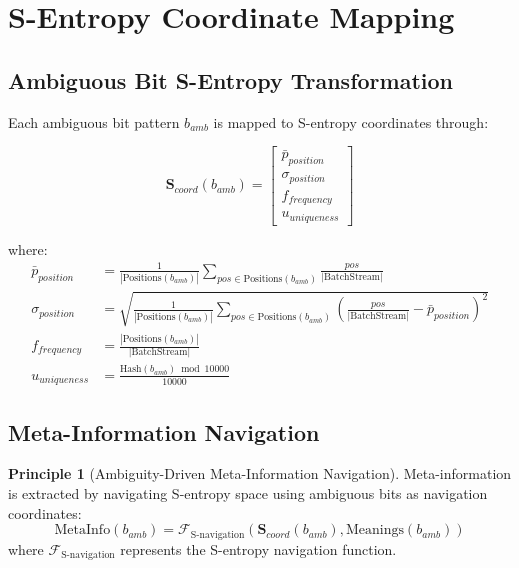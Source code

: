 \documentclass[12pt,a4paper]{article}
\theoremstyle{definition}
\newtheorem{principle}{Principle}
\begin{document}
\section{S-Entropy Coordinate Mapping}

\subsection{Ambiguous Bit S-Entropy Transformation}

Each ambiguous bit pattern $b_{amb}$ is mapped to S-entropy coordinates through:

\begin{equation}
\mathbf{S}_{coord}(b_{amb}) = \begin{bmatrix}
\bar{p}_{position} \\
\sigma_{position} \\
f_{frequency} \\
u_{uniqueness}
\end{bmatrix}
\end{equation}

where:
\begin{align}
\bar{p}_{position} &= \frac{1}{|\text{Positions}(b_{amb})|} \sum_{pos \in \text{Positions}(b_{amb})} \frac{pos}{|\text{BatchStream}|} \\
\sigma_{position} &= \sqrt{\frac{1}{|\text{Positions}(b_{amb})|} \sum_{pos \in \text{Positions}(b_{amb})} \left(\frac{pos}{|\text{BatchStream}|} - \bar{p}_{position}\right)^2} \\
f_{frequency} &= \frac{|\text{Positions}(b_{amb})|}{|\text{BatchStream}|} \\
u_{uniqueness} &= \frac{\text{Hash}(b_{amb}) \bmod 10000}{10000}
\end{align}

\subsection{Meta-Information Navigation}

\begin{principle}[Ambiguity-Driven Meta-Information Navigation]
Meta-information is extracted by navigating S-entropy space using ambiguous bits as navigation coordinates:
\begin{equation}
\text{MetaInfo}(b_{amb}) = \mathcal{F}_{\text{S-navigation}}(\mathbf{S}_{coord}(b_{amb}), \text{Meanings}(b_{amb}))
\end{equation}
where $\mathcal{F}_{\text{S-navigation}}$ represents the S-entropy navigation function.
\end{principle}
\end{document}
